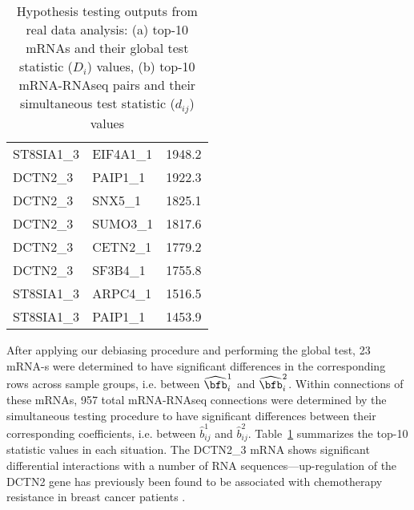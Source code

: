 \begin{table}[t!]
\begin{minipage}{.5\linewidth}
\begin{tabular}{lll}
ST8SIA1\_3 & EIF4A1\_1  & 1948.2    \\ 
DCTN2\_3   & PAIP1\_1   & 1922.3    \\ 
DCTN2\_3   & SNX5\_1    & 1825.1    \\ 
DCTN2\_3   & SUMO3\_1   & 1817.6    \\ 
DCTN2\_3   & CETN2\_1   & 1779.2    \\ 
DCTN2\_3   & SF3B4\_1   & 1755.8    \\ 
ST8SIA1\_3 & ARPC4\_1   & 1516.5    \\ 
ST8SIA1\_3 & PAIP1\_1   & 1453.9    \\\hline
\end{tabular}
\end{minipage}
\caption{Hypothesis testing outputs from real data analysis: (a) top-10 mRNAs and their global test statistic ($D_i$) values, (b) top-10 mRNA-RNAseq pairs and their simultaneous test statistic ($d_{ij}$) values}
\label{table:realtesting}
\end{table}

After applying our debiasing procedure and performing the global test, 23 mRNA-s were determined to have significant differences in the corresponding rows across sample groups, i.e. between $\widehat \bfb_i^1$ and $\widehat \bfb_i^2$. Within connections of these mRNAs, 957 total mRNA-RNAseq connections were determined by the simultaneous testing procedure to have significant differences between their corresponding coefficients, i.e. between $\hat b_{ij}^1$ and $\hat b_{ij}^2$. Table~\ref{table:realtesting} summarizes the top-10 statistic values in each situation. The DCTN2\_3 mRNA shows significant differential interactions with a number of RNA sequences---up-regulation of the DCTN2 gene has previously been found to be associated with chemotherapy resistance in breast cancer patients \citep{dctn2}. 
